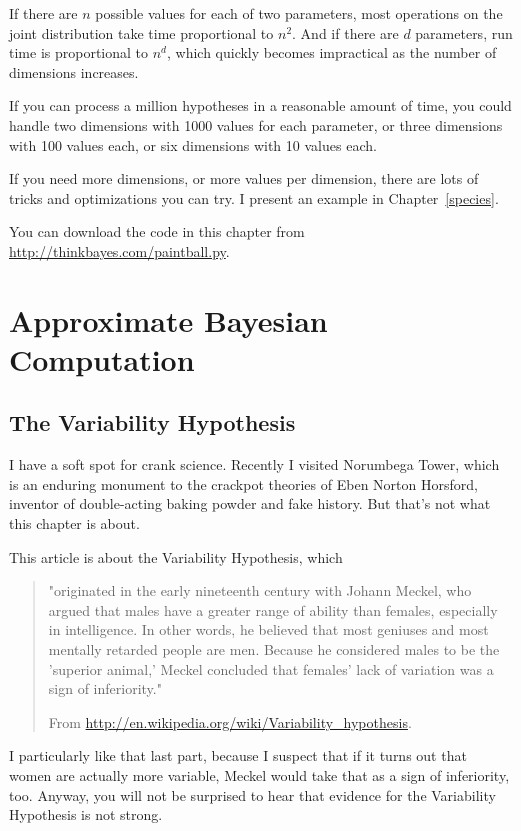 \documentclass[12pt]{book}
\begin{document}
If there are $n$ possible values for each of two parameters, most
operations on the joint distribution take time proportional to $n^2$.
And if there are $d$ parameters, run time is proportional to $n^d$,
which quickly becomes impractical as the number of dimensions increases.

If you can process a million hypotheses in a reasonable amount of time,
you could handle two dimensions with 1000 values for each parameter,
or three dimensions with 100 values each, or six dimensions with 10
values each.

If you need more dimensions, or more values per dimension, there are
lots of tricks and optimizations you can try.  I present an example
in Chapter~\ref{species}.

You can download the code in this chapter from
\url{http://thinkbayes.com/paintball.py}.


\chapter{Approximate Bayesian Computation}

\section{The Variability Hypothesis}

I have a soft spot for crank science.  Recently I visited Norumbega
Tower, which is an enduring monument to the crackpot theories of Eben
Norton Horsford, inventor of double-acting baking powder and fake
history.  But that's not what this chapter is about.

This article is about the Variability Hypothesis, which

\begin{quote}
"originated in the early nineteenth century with Johann Meckel, who
  argued that males have a greater range of ability than females,
  especially in intelligence. In other words, he believed that most
  geniuses and most mentally retarded people are men. Because he
  considered males to be the 'superior animal,' Meckel concluded that
  females' lack of variation was a sign of inferiority."

From \url{http://en.wikipedia.org/wiki/Variability_hypothesis}.
\end{quote}

I particularly like that last part, because I suspect that if it turns
out that women are actually more variable, Meckel would take that as a
sign of inferiority, too.  Anyway, you will not be surprised to hear
that evidence for the Variability Hypothesis is not strong.
\end{document}
